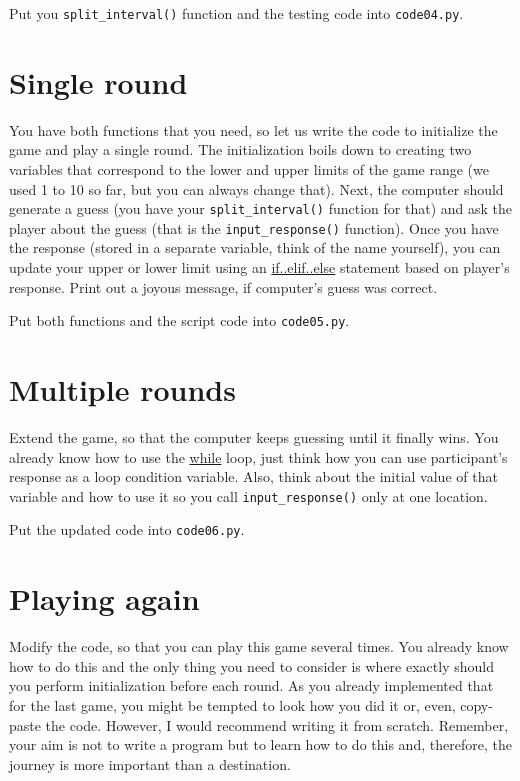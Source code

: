 \documentclass[
]{book}
\begin{document}
Put you \texttt{split\_interval()} function and the testing code into \texttt{code04.py}.

\hypertarget{single-round}{%
\section{Single round}\label{single-round}}

You have both functions that you need, so let us write the code to initialize the game and play a single round. The initialization boils down to creating two variables that correspond to the lower and upper limits of the game range (we used 1 to 10 so far, but you can always change that). Next, the computer should generate a guess (you have your \texttt{split\_interval()} function for that) and ask the player about the guess (that is the \texttt{input\_response()} function). Once you have the response (stored in a separate variable, think of the name yourself), you can update your upper or lower limit using an \protect\hyperlink{if-statement}{if..elif..else} statement based on player's response. Print out a joyous message, if computer's guess was correct.

Put both functions and the script code into \texttt{code05.py}.

\hypertarget{multiple-rounds}{%
\section{Multiple rounds}\label{multiple-rounds}}

Extend the game, so that the computer keeps guessing until it finally wins. You already know how to use the \protect\hyperlink{while-loop}{while} loop, just think how you can use participant's response as a loop condition variable. Also, think about the initial value of that variable and how to use it so you call \texttt{input\_response()} only at one location.

Put the updated code into \texttt{code06.py}.

\hypertarget{playing-again}{%
\section{Playing again}\label{playing-again}}

Modify the code, so that you can play this game several times. You already know how to do this and the only thing you need to consider is where exactly should you perform initialization before each round. As you already implemented that for the last game, you might be tempted to look how you did it or, even, copy-paste the code. However, I would recommend writing it from scratch. Remember, your aim is not to write a program but to learn how to do this and, therefore, the journey is more important than a destination.
\end{document}
